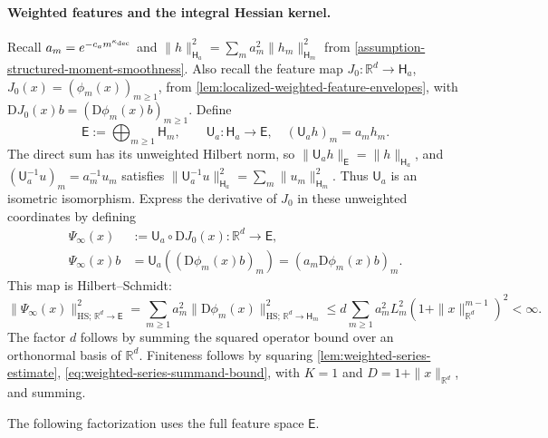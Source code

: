 \paragraph{Weighted features and the integral Hessian kernel.}
Recall $a_m=e^{-c_am^{\kappa_{\rm dec}}}$ and
$\|h\|_{\mathsf H_a}^2=\sum_ma_m^2\|h_m\|_{\mathsf H_m}^2$ from
\cref{assumption-structured-moment-smoothness}. Also recall the feature map
$J_0:\mathbb R^d\to\mathsf H_a$, $J_0(x)=(\phi_m(x))_{m\ge1}$, from
\cref{lem:localized-weighted-feature-envelopes}, with
$\mathrm D J_0(x)b=(\mathrm D\phi_m(x)b)_{m\ge1}$. Define
\[
 \mathsf E:=\bigoplus_{m\ge1}\mathsf H_m,\qquad
 \mathsf U_a:\mathsf H_a\longrightarrow\mathsf E,
 \quad(\mathsf U_a h)_m=a_mh_m.
\]
The direct sum has its unweighted Hilbert norm, so
$\|\mathsf U_a h\|_{\mathsf E}=\|h\|_{\mathsf H_a}$, and
$(\mathsf U_a^{-1}u)_m=a_m^{-1}u_m$ satisfies
$\|\mathsf U_a^{-1}u\|_{\mathsf H_a}^2=\sum_m\|u_m\|_{\mathsf H_m}^2$.
Thus $\mathsf U_a$ is an isometric isomorphism. Express the derivative
of $J_0$ in these unweighted coordinates by defining
\begin{equation}
\label{eq:weighted-feature-j0-identification}
\begin{aligned}
 \Psi_\infty(x)&:=\mathsf U_a\circ\mathrm D J_0(x)
       :\mathbb R^d\to\mathsf E,\\
 \Psi_\infty(x)b&=\mathsf U_a((\mathrm D\phi_m(x)b)_m)
       =(a_m\mathrm D\phi_m(x)b)_m.
\end{aligned}
\end{equation}
This map is Hilbert--Schmidt:
\begin{equation}
\label{eq:full-weighted-feature-norm}
 \|\Psi_\infty(x)\|_{\mathrm{HS};\,\mathbb R^d\to\mathsf E}^2
 =\sum_{m\ge1}a_m^2\|\mathrm D\phi_m(x)\|_{\mathrm{HS};\,\mathbb R^d\to\mathsf H_m}^2
 \le d\sum_{m\ge1}a_m^2L_m^2(1+\|x\|_{\mathbb R^d}^{m-1})^2<\infty.
\end{equation}
The factor $d$ follows by summing the squared operator bound over an
orthonormal basis of $\mathbb R^d$. Finiteness follows by squaring \cref{lem:weighted-series-estimate},
\eqref{eq:weighted-series-summand-bound}, with $K=1$ and
$D=1+\|x\|_{\mathbb R^d}$, and summing.

The following factorization uses the full feature space $\mathsf E$.

